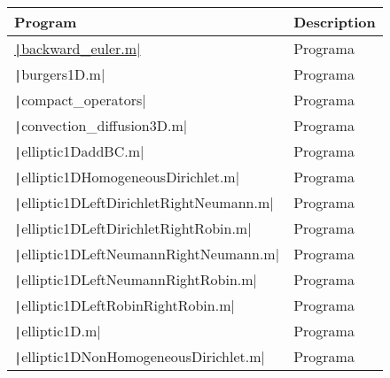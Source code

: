 \begin{table}[ht!]
	\centering
	\begin{tabular}{|l|l|}
		\toprule
		Program                                                                                                                    & Description \\
		\midrule
		\href{https://github.com/csrc-sdsu/mole/blob/master/examples/matlab/backward_euler.m}{\texttt|backward_euler.m|} & Programa    \\
		\texttt|burgers1D.m|                                                                                             & Programa    \\
		\texttt|compact_operators|                                                                                       & Programa    \\
		\texttt|convection_diffusion3D.m|                                                                                & Programa    \\
		\texttt|elliptic1DaddBC.m|                                                                                       & Programa    \\
		\texttt|elliptic1DHomogeneousDirichlet.m|                                                                        & Programa    \\
		\texttt|elliptic1DLeftDirichletRightNeumann.m|                                                                   & Programa    \\
		\texttt|elliptic1DLeftDirichletRightRobin.m|                                                                     & Programa    \\
		\texttt|elliptic1DLeftNeumannRightNeumann.m|                                                                     & Programa    \\
		\texttt|elliptic1DLeftNeumannRightRobin.m|                                                                       & Programa    \\
		\texttt|elliptic1DLeftRobinRightRobin.m|                                                                         & Programa    \\
		\texttt|elliptic1D.m|                                                                                            & Programa    \\
		\texttt|elliptic1DNonHomogeneousDirichlet.m|                                                                     & Programa    \\

\end{tabular}
\end{table}
